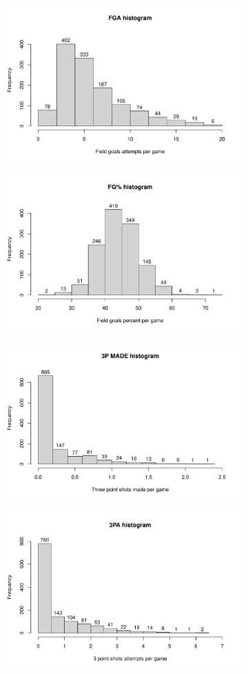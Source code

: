 \begin{figure}[H]
\begin{subfigure}{.3\textwidth}
		\caption{}
		\label{fig:HistFGM}
	\end{subfigure}%
	\begin{subfigure}{.3\textwidth}
		\centering
		\includegraphics[width=0.5\linewidth]{ImageFiles/Histograms/histogram_fga.pdf}
		\caption{}
		\label{fig:HistFGA}
	\end{subfigure}%
	\begin{subfigure}{.3\textwidth}
		\centering
		\includegraphics[width=0.5\linewidth]{ImageFiles/Histograms/histogram_fg.pdf}
		\caption{}
		\label{fig:HistFG}
	\end{subfigure}
	\begin{subfigure}{.3\textwidth}
		\centering
		\includegraphics[width=0.5\linewidth]{ImageFiles/Histograms/histogram_x3pmade.pdf}
		\caption{}
		\label{fig:HistX3PMADE}
	\end{subfigure}%
	\begin{subfigure}{.3\textwidth}
		\centering
		\includegraphics[width=0.5\linewidth]{ImageFiles/Histograms/histogram_x3pa.pdf}

\end{subfigure}
\end{figure}
